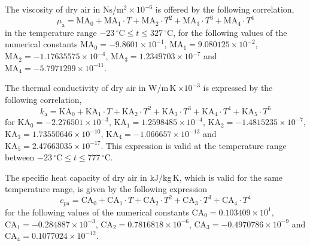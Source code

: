 \documentclass[11pt]{article}
\newcommand{\mdegC}{^{\circ}\mathrm{C}}
\begin{document}

\noindent The viscosity of dry air in Ns/m$^2\times10^{-6}$ is offered
by the following correlation,
\begin{equation}
\mu_\mathrm{a} = \mathrm{MA}_0 + \mathrm{MA}_1\cdot T
  + \mathrm{MA}_2\cdot T^{2} + \mathrm{MA}_3\cdot T^{3}
  + \mathrm{MA}_4\cdot T^{4}
\end{equation}
in the temperature range $-23\,\mdegC \leqslant t \leqslant 327\,\mdegC$,
for the following values of the numerical constants
$\mathrm{MA}_0 = -9.8601\times10^{-1}$,
$\mathrm{MA}_1 = 9.080125\times10^{-2}$,
$\mathrm{MA}_2 = -1.17635575\times10^{-4}$,
$\mathrm{MA}_3 = 1.2349703\times10^{-7}$ and
$\mathrm{MA}_4 = -5.7971299\times10^{-11}$.

\noindent The thermal conductivity of dry air in
W/m\,K\,$\times10^{-3}$ is expressed by the following correlation,
\begin{equation}
k_\mathrm{a} = \mathrm{KA}_0 + \mathrm{KA}_1\cdot T
  + \mathrm{KA}_2\cdot T^{2} + \mathrm{KA}_3\cdot T^{3}
  + \mathrm{KA}_4\cdot T^{4} + \mathrm{KA}_5\cdot T^{5}
\end{equation}
for
$\mathrm{KA}_0 = -2.276501\times10^{-3}$,
$\mathrm{KA}_1 = 1.2598485\times10^{-4}$,
$\mathrm{KA}_2 = -1.4815235\times10^{-7}$,
$\mathrm{KA}_3 = 1.73550646\times10^{-10}$,
$\mathrm{KA}_4 = -1.066657\times10^{-13}$ and
$\mathrm{KA}_5 = 2.47663035\times10^{-17}$.
This expression is valid at the temperature range between
$-23\,\mdegC \leqslant t \leqslant 777\,\mdegC$.

\noindent The specific heat capacity of dry air in kJ/kg\,K, which is
valid for the same temperature range, is given by the following
expression
\begin{equation}
c_{p\mathrm{a}} = \mathrm{CA}_0 + \mathrm{CA}_1\cdot T
  + \mathrm{CA}_2\cdot T^{2} + \mathrm{CA}_3\cdot T^{3}
  + \mathrm{CA}_4\cdot T^{4}
\end{equation}
for the following values of the numerical constants
$\mathrm{CA}_0 = 0.103409\times10^{1}$,
$\mathrm{CA}_1 = -0.284887\times10^{-3}$,
$\mathrm{CA}_2 = 0.7816818\times10^{-6}$,
$\mathrm{CA}_3 = -0.4970786\times10^{-9}$ and
$\mathrm{CA}_4 = 0.1077024\times10^{-12}$.
\end{document}
